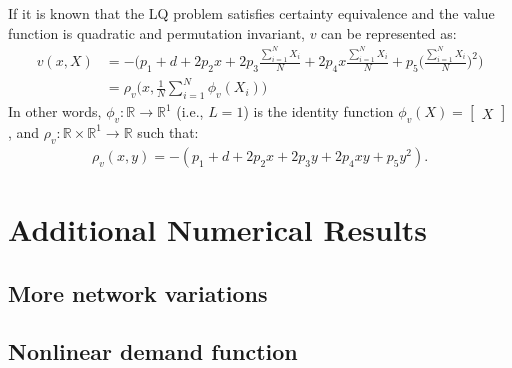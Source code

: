 \documentclass[12pt]{article}
\begin{document}
If it is known that the LQ problem satisfies certainty equivalence and the value function is quadratic and permutation invariant, $v$ can be represented as: 
\begin{align*}
v(x, X) &= -\bigg(p_1+d +2 p_2 x +2 p_3\frac{\sum_{i=1}^{N}X_i}{N}+2 p_4 x \frac{\sum_{i=1}^{N}X_i}{N} +p_5\big(\frac{\sum_{i=1}^{N}X_i}{N}\big)^2\bigg) \\
&= \rho_v \big(x, \frac{1}{N}\sum_{i=1}^N\phi_v(X_i)\big)
\end{align*}
In other words, $\phi_v: \mathbb{R}\rightarrow \mathbb{R}^1$ (i.e., $L=1$) is the identity function $\phi_v(X) = \begin{bmatrix}X\end{bmatrix}$, and $\rho_v : \mathbb{R} \times \mathbb{R}^1\rightarrow \mathbb{R}$ such that:
\begin{align*}
\rho_v(x,y) = - (p_1+d +2 p_2 x + 2 p_3 y + 2 p_4 x y +p_5 y^2).
\end{align*}
	
\section{Additional Numerical Results}
\subsection{More network variations}
\label{subsec:tab-longer-linear-prices}	
\renewcommand{\arraystretch}{1.2}


%

\subsection{Nonlinear demand function}
\label{subsec:tab-nonlinear-prices}
\end{document}
